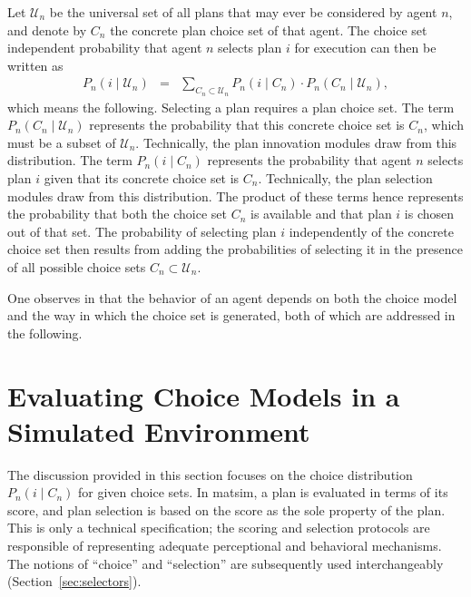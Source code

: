 Let $\mathcal{U}_n$ be the universal set of all plans that may ever be considered
by agent $n$, and denote by $C_{n}$ the concrete plan choice set
of that agent. The choice set independent probability that agent $n$
selects plan $i$ for execution can then be written as
\begin{eqnarray}
P_{n}(i\mid \mathcal{U}_n) & = & \sum_{C_{n}\subset \mathcal{U}_n}P_{n}(i\mid C_{n})\cdot P_{n}(C_{n}\mid \mathcal{U}_n),
\label{eq:unconditional-choice-proba}
\end{eqnarray}
which means the following. Selecting a plan requires a plan choice
set. The term $P_{n}(C_{n}\mid \mathcal{U}_n)$ represents the probability that
this concrete choice set is $C_{n}$, which must be a subset of $\mathcal{U}_n$.
Technically, the plan innovation modules draw from this distribution.
The term $P_{n}(i\mid C_{n})$ represents the probability that agent
$n$ selects plan $i$ given that its concrete choice set is $C_{n}$.
Technically, the plan selection modules draw from this distribution.
The product of these terms hence represents the probability that both
the choice set $C_{n}$ is available and that plan $i$ is chosen out
of that set. The probability of selecting plan $i$ independently
of the concrete choice set then results from adding the probabilities
of selecting it in the presence of all possible choice sets $C_{n}\subset \mathcal{U}_n$.

One observes in  that the
behavior of an agent depends on both the choice model and the way
in which the choice set is generated, both of which are addressed
in the following.

\section{\label{sec:Evaluating-choice-models}Evaluating Choice Models in
a Simulated Environment}

The discussion provided in this section focuses on the choice distribution
$P_{n}(i\mid C_{n})$ for given choice sets. In \gls{matsim}, a plan is
evaluated in terms of its score, and plan selection is based on the
score as the sole property of the plan. This is only a technical specification;
the scoring and selection protocols are responsible of representing
adequate perceptional and behavioral mechanisms. The notions of {}``choice''
and {}``selection'' are subsequently used interchangeably (\cf Section~\ref{sec:selectors}).

